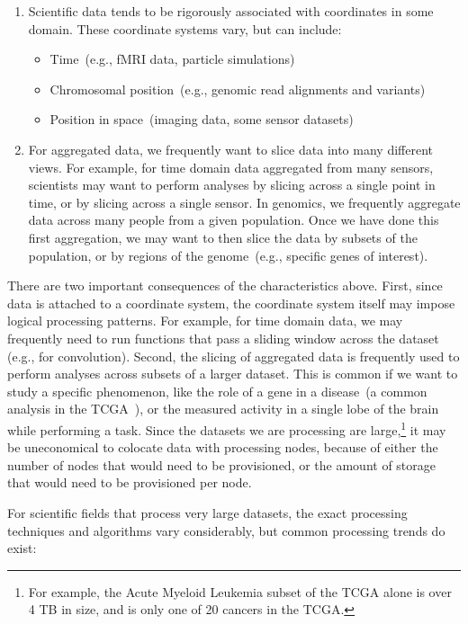 \documentclass{acm_proc_article-sp}
\begin{document}
\begin{enumerate}
\item Scientific data tends to be rigorously associated with coordinates in some domain. These coordinate
systems vary, but can include:
\begin{itemize}
\item Time~(e.g., fMRI data, particle simulations)
\item Chromosomal position~(e.g., genomic read alignments and variants)
\item Position in space~(imaging data, some \linebreak sensor datasets)
\end{itemize}
\item For aggregated data, we frequently want to slice data into many different views. For example, for time
domain data aggregated from many sensors, scientists may want to perform analyses by slicing
across a single point in time, or by slicing across a single sensor. In genomics, we frequently aggregate data
across many people from a given population. Once we have done this first aggregation, we may want to then
slice the data by subsets of the population, or by regions of the genome~(e.g., specific genes of interest).
\end{enumerate}

There are two important consequences of the characteristics above. First, since data is attached to a
coordinate system, the coordinate system itself may impose logical processing patterns. For example, for
time domain data, we may frequently need to run functions that pass a sliding window across the dataset (e.g., for
convolution). Second, the slicing of aggregated data is frequently used to perform analyses across
subsets of a larger dataset. This is common if we want to study a specific phenomenon, like the role of a
gene in a disease~(a common analysis in the TCGA~\cite{weinstein13}), or the measured activity in a
single lobe of the brain while performing a task. Since the datasets we are processing are
large,\footnote{For example, the Acute Myeloid Leukemia subset of the TCGA alone is over 4 TB in size, and
is only one of 20 cancers in the TCGA.} it may be uneconomical to colocate data with processing nodes,
because of either the number of nodes that would need to be provisioned, or the amount of storage that would
need to be provisioned per node.

For scientific fields that process very large datasets, the exact processing techniques and algorithms vary
considerably, but common processing trends do exist:
\end{document}
